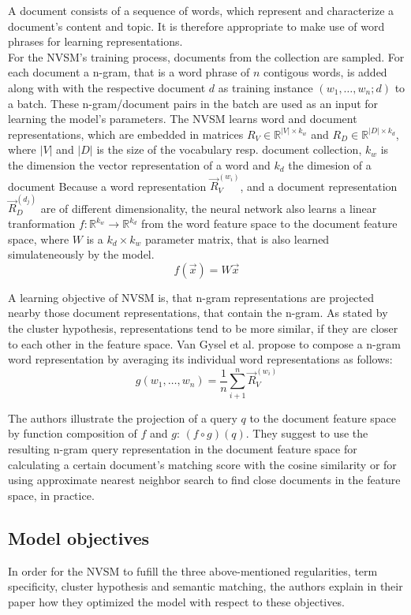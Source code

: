 A document consists of a sequence of words,
    which represent and characterize a document's content and topic.
It is therefore appropriate to make use of word phrases
    for learning representations.\\
For the NVSM's training process, documents from the collection are
    sampled.
For each document a n-gram, that is a word phrase of $n$ 
    contigous words, is added
    along with with the respective document $d$ as
    training instance $(w_1, \ldots, w_n; d)$ to a batch.
These n-gram/document pairs in the batch are used
    as an input for learning the model's parameters.
The NVSM learns word and document representations,
    which are embedded in matrices $R_V \in \mathbb{R}^{|V| \times k_w}$
    and $R_D \in \mathbb{R}^{|D| \times k_d}$, where 
    $|V|$ and $|D|$ is the size of the vocabulary resp. document collection,
    $k_w$ is the dimension the vector representation of a word and
    $k_d$ the dimesion of a document
Because a word representation $\vec{R}_V^{(w_i)}$,
    and a document representation $\vec{R}_D^{(d_j)}$ are of different
    dimensionality, the neural network also learns a linear
    tranformation $f \colon \mathbb{R}^{k_w} \to \mathbb{R}^{k_d}$ 
    from the word feature space to the document feature space,
    where $W$ is a $k_d \times k_w$ parameter matrix, that is 
    also learned simulateneously by the model.
\[
f(\vec{x}) = W\vec{x}
\]

A learning objective of NVSM is, that n-gram representations are projected
    nearby those document representations, that contain the n-gram.
As stated by the cluster hypothesis, representations tend to be 
    more similar, if they are closer to each other in the feature space.
Van Gysel et al. propose to compose a n-gram word representation by
    averaging its individual word representations as follows:
\[
g(w_1, \ldots, w_n) = \frac{1}{n} \sum_{i+1}^{n} \vec{R}_V^{(w_i)}
\]

The authors illustrate the projection of a query $q$ to the document
    feature space by function composition of $f$ and $g$: $(f \circ g)(q)$.
They suggest to use the resulting n-gram query representation in the document 
    feature space for calculating a certain document's matching score
    with the cosine similarity or for using approximate 
    nearest neighbor search to find close documents in the 
    feature space, in practice.\cite{van-gysel:2017:neural-vector-spaces}

\subsection*{Model objectives}

In order for the NVSM to fufill the three above-mentioned regularities,
    term specificity, cluster hypothesis and semantic matching,
    the authors explain in their paper how they optimized 
    the model with respect to these objectives.
    \cite{van-gysel:2017:neural-vector-spaces}




